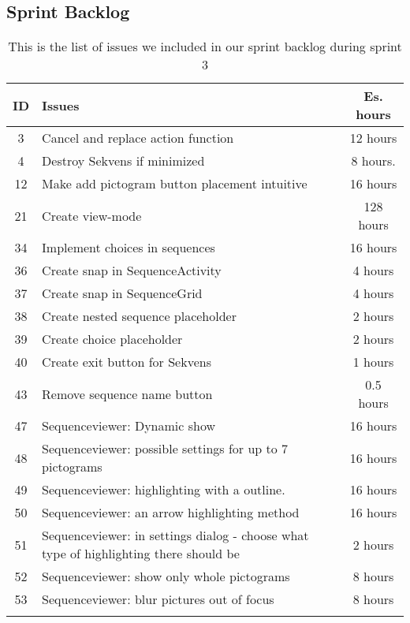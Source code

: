\subsection{Sprint Backlog}\label{subsec:spr3_sprblog}
\begin{longtable} { | c | p{12cm} | c | } 
\hline
	ID 	&	Issues	&	Es. hours  \\\hline
	3	& 	Cancel and replace action function	&	12 hours \\\hline
	4	&	Destroy Sekvens if minimized	&	8 hours.	\\\hline
	12	& 	Make add pictogram button placement intuitive	&	16 hours 	\\\hline
	21	& 	Create view-mode				&	128 hours	\\\hline
	34	&	Implement choices in sequences		& 	16 hours  \\\hline
	36	& 	Create snap in SequenceActivity		&	4 hours  \\\hline
	37	&	Create snap in SequenceGrid		& 	4 hours \\\hline
	38	& 	Create nested sequence placeholder 		&	2 hours\\\hline
	39	&	Create choice placeholder		 		&	2 hours \\\hline
	40	&	Create exit button for Sekvens	&	1 hours \\\hline
	43	&	Remove sequence name button			&	0.5 hours \\\hline
	47	&	Sequenceviewer: Dynamic show	 	&	16 hours \\\hline
	48	&	Sequenceviewer: possible settings for up to 7 pictograms	 & 	16 hours	\\\hline
	49	&	Sequenceviewer: highlighting with a outline.	  &	16 hours \\\hline
	50	&	Sequenceviewer: an arrow highlighting method	 &	16 hours \\\hline
	51	&	Sequenceviewer: in settings dialog - choose what type of highlighting there should be	 &	2 hours \\\hline
	52	&	Sequenceviewer: show only whole pictograms	&	8 hours	\\\hline
	53	&	Sequenceviewer: blur pictures out of focus		 &	8 hours \\\hline
\caption{This is the list of issues we included in our sprint backlog during sprint 3}
\label{tab:spr3_sprintblog}
\end{longtable}